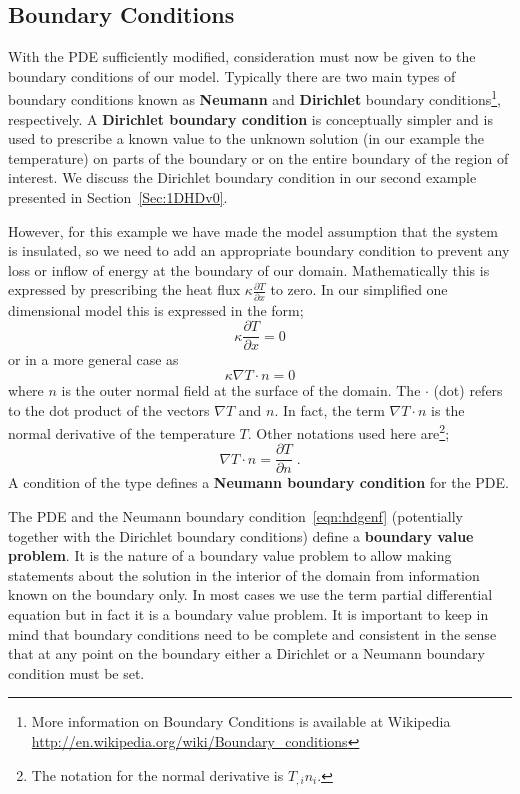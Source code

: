\subsection{Boundary Conditions}
\label{SEC BOUNDARY COND}
With the PDE sufficiently modified, consideration must now be given to the
boundary conditions of our model. Typically there are two main types of boundary
conditions known as \textbf{Neumann} and \textbf{Dirichlet} boundary
conditions\footnote{More information on Boundary Conditions is available at
Wikipedia \url{http://en.wikipedia.org/wiki/Boundary_conditions}},
respectively. 
A \textbf{Dirichlet boundary condition} is conceptually simpler and is used to
prescribe a known value to the unknown solution (in our example the temperature)
on parts of the boundary or on the entire boundary of the region of interest. 
We discuss the Dirichlet boundary condition in our second example presented in
Section~\ref{Sec:1DHDv0}.

However, for this example we have made the model assumption that the system is
insulated, so we need to add an appropriate boundary condition to prevent
any loss or inflow of energy at the boundary of our domain. Mathematically this
is expressed by prescribing
the heat flux $\kappa \frac{\partial T}{\partial x}$  to zero. In our simplified
one dimensional model this is expressed
in the form;
\begin{equation}
\kappa \frac{\partial T}{\partial x}  = 0 
\end{equation}
or in a more general case as
\begin{equation}\label{NEUMAN 1}
\kappa \nabla T \cdot n  = 0 
\end{equation}
where $n$  is the outer normal field  at the surface
of the domain. 
The $\cdot$ (dot) refers to the dot product of the vectors $\nabla T$ and $n$.
In fact, the term $\nabla T \cdot n$ is the normal derivative of 
the temperature $T$. Other notations used here are\footnote{The \esc notation
for the normal
derivative is $T_{,i} n_i$.};
\begin{equation}
\nabla T \cdot n  = \frac{\partial T}{\partial n} \; .
\end{equation}
A condition of the type  defines a \textbf{Neumann boundary
condition} for the PDE. 

The PDE  
and the Neumann boundary condition~\ref{eqn:hdgenf} (potentially together with
the Dirichlet boundary conditions)  define a \textbf{boundary value problem}. 
It is the nature of a boundary value problem to allow making statements about
the solution in the
interior of the domain from information known on the boundary only. In most
cases we use the term partial differential equation but in fact it is a
boundary value problem. 
It is important to keep in mind that boundary conditions need to be complete and
consistent in the sense that 
at any point on the boundary either a Dirichlet or a Neumann boundary condition
must be set.

